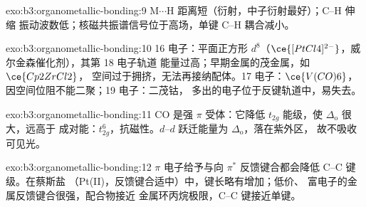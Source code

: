 \begin{solution}{exo:b3:organometallic-bonding:9}
M$\cdots$H 距离短（衍射，中子衍射最好）；C--H 伸缩
振动波数低；核磁共振谱信号位于高场，单键 C--H 耦合减小。
\end{solution}

\begin{solution}{exo:b3:organometallic-bonding:10}
16 电子：平面正方形 $d^8$（$\ce{[PtCl4]^{2-}}$，威尔金森催化剂），其第 18 电子轨道
能量过高；早期金属的茂金属，如 $\ce{Cp2ZrCl2}$，
空间过于拥挤，无法再接纳配体。17 电子：$\ce{V(CO)6}$，因空间位阻不能二聚；19 电子：二茂钴，
多出的电子位于反键轨道中，易失去。
\end{solution}

\begin{solution}{exo:b3:organometallic-bonding:11}
CO 是强 $\pi$ 受体：它降低 $t_{2g}$ 能级，使 $\Delta_{\mathrm o}$ 很大，远高于
成对能：$t_{2g}^6$，抗磁性。$d$--$d$ 跃迁能量为 $\Delta_{\mathrm o}$，落在紫外区，
故不吸收可见光。
\end{solution}

\begin{solution}{exo:b3:organometallic-bonding:12}
$\pi$ 电子给予与向 $\pi^*$ 反馈键合都会降低 C--C 键级。在蔡斯盐
（Pt(II)，反馈键合适中）中，键长略有增加；低价、
富电子的金属反馈键合很强，配合物接近
金属环丙烷极限，C--C 键接近单键。
\end{solution}

